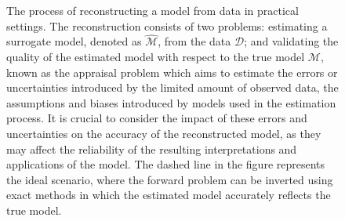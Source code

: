 \begin{figure}[htp]


\caption{The process of reconstructing a model from data in practical settings. The reconstruction consists of two problems: estimating a surrogate model, denoted as $\widehat{\mathcal{M}}$, from the data $\mathcal{D}$; and validating the quality of the estimated model with respect to the true model $\mathcal{M}$, known as the appraisal problem which aims to estimate the errors or uncertainties introduced by the limited amount of observed data, the assumptions and biases introduced by models used in the estimation process. It is crucial to consider the impact of these errors and uncertainties on the accuracy of the reconstructed model, as they may affect the reliability of the resulting interpretations and applications of the model.
The dashed line in the figure represents the ideal scenario, where the forward problem can be inverted using exact methods in which the estimated model accurately reflects the true model.}
\label{fig:inverse_problem}
\end{figure}


